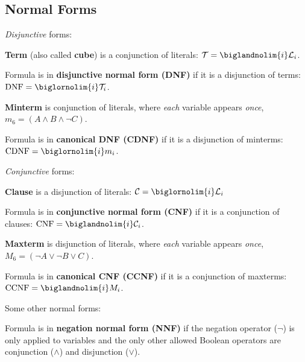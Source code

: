 \documentclass[a4paper,10pt]{article}
\begin{document}
\subsection{Normal Forms}


\begin{terms}
    \item \emph{Disjunctive} forms:
    \begin{terms}
        \item \textbf{Term} (also called \textbf{cube}) is a conjunction of literals: $\mathcal{T} = \biglandnolim{i} \mathcal{L}_i$.

        \item Formula is in \textbf{disjunctive normal form (DNF)} if it is a disjunction of terms: $\textrm{DNF} = \biglornolim{i} \mathcal{T}_i$.

        \item \textbf{Minterm} is conjunction of literals, where \emph{each} variable appears \emph{once}, \eg $m_6 = (A \land B \land \neg C)$.

        \item Formula is in \textbf{canonical DNF (CDNF)} if it is a disjunction of minterms: $\textrm{CDNF} = \biglornolim{i} m_i$.
    \end{terms}

    \item \emph{Conjunctive} forms:
    \begin{terms}
        \item \textbf{Clause} is a disjunction of literals: $\mathcal{C} = \biglornolim{i} \mathcal{L}_i$

        \item Formula is in \textbf{conjunctive normal form (CNF)} if it is a conjunction of clauses: $\textrm{CNF} = \biglandnolim{i} \mathcal{C}_i$.

        \item \textbf{Maxterm} is disjunction of literals, where \emph{each} variable appears \emph{once}, \eg $M_6 = (\neg A \lor \neg B \lor C)$.

        \item Formula is in \textbf{canonical CNF (CCNF)} if it is a conjunction of maxterms: $\textrm{CCNF} = \biglandnolim{i} M_i$.
    \end{terms}

    \item Some other normal forms:
    \begin{terms}
        \item Formula is in \textbf{negation normal form (NNF)} if the negation operator ($\neg$) is only applied to variables and the only other allowed Boolean operators are conjunction ($\land$) and disjunction ($\lor$).


\end{terms}
\end{terms}
\end{document}

